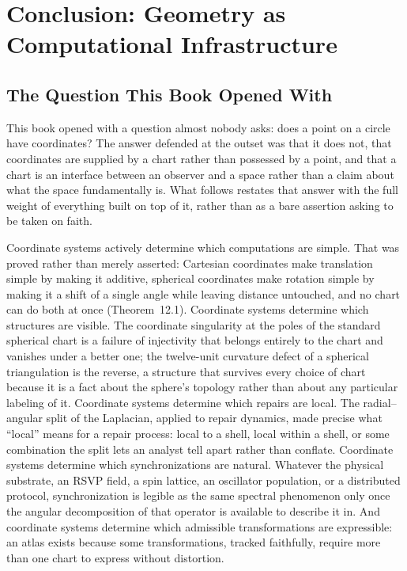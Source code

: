 \documentclass[11pt,fleqn]{book}
\numberwithin{equation}{chapter}
\theoremstyle{plain}
\theoremstyle{definition}
\theoremstyle{remark}
\providecommand{\enquote}[1]{``#1''}
\begin{document}

\chapter{Conclusion: Geometry as Computational Infrastructure}

\section{The Question This Book Opened With}

This book opened with a question almost nobody asks: does a point on a circle have coordinates? The answer defended at the outset was that it does not, that coordinates are supplied by a chart rather than possessed by a point, and that a chart is an interface between an observer and a space rather than a claim about what the space fundamentally is. What follows restates that answer with the full weight of everything built on top of it, rather than as a bare assertion asking to be taken on faith.

Coordinate systems actively determine which computations are simple. That was proved rather than merely asserted: Cartesian coordinates make translation simple by making it additive, spherical coordinates make rotation simple by making it a shift of a single angle while leaving distance untouched, and no chart can do both at once (Theorem~12.1). Coordinate systems determine which structures are visible. The coordinate singularity at the poles of the standard spherical chart is a failure of injectivity that belongs entirely to the chart and vanishes under a better one; the twelve-unit curvature defect of a spherical triangulation is the reverse, a structure that survives every choice of chart because it is a fact about the sphere's topology rather than about any particular labeling of it. Coordinate systems determine which repairs are local. The radial--angular split of the Laplacian, applied to repair dynamics, made precise what \enquote{local} means for a repair process: local to a shell, local within a shell, or some combination the split lets an analyst tell apart rather than conflate. Coordinate systems determine which synchronizations are natural. Whatever the physical substrate, an RSVP field, a spin lattice, an oscillator population, or a distributed protocol, synchronization is legible as the same spectral phenomenon only once the angular decomposition of that operator is available to describe it in. And coordinate systems determine which admissible transformations are expressible: an atlas exists because some transformations, tracked faithfully, require more than one chart to express without distortion.
\end{document}
